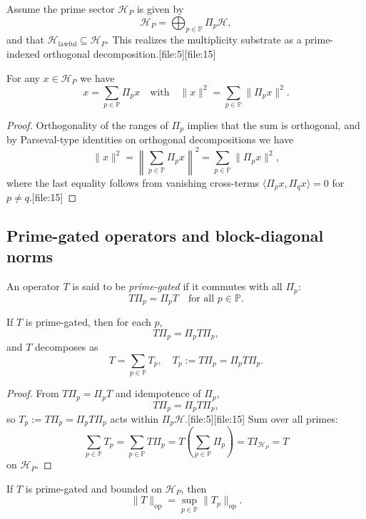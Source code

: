 \documentclass[11pt]{article}
\begin{document}
Assume the prime sector \(\mathcal{H}_P\) is given by
\[
\mathcal{H}_P = \bigoplus_{p\in\mathbb{P}} \Pi_p \mathcal{H},
\]
and that \(\mathcal{H}_{\mathrm{lawful}}\subseteq \mathcal{H}_P\).  
This realizes the multiplicity substrate as a prime-indexed orthogonal decomposition.[file:5][file:15]

\begin{lemma}
For any \(x\in\mathcal{H}_P\) we have
\[
x = \sum_{p\in\mathbb{P}} \Pi_p x \quad\text{with}\quad \|x\|^2 = \sum_{p\in\mathbb{P}} \|\Pi_p x\|^2.
\]
\end{lemma}

\begin{proof}
Orthogonality of the ranges of \(\Pi_p\) implies that the sum is orthogonal, and by Parseval-type identities on orthogonal decompositions we have
\[
\|x\|^2 = \left\|\sum_{p\in\mathbb{P}} \Pi_p x\right\|^2 = \sum_{p\in\mathbb{P}} \|\Pi_p x\|^2,
\]
where the last equality follows from vanishing cross-terms \(\langle \Pi_p x, \Pi_q x\rangle = 0\) for \(p\ne q\).[file:15]
\end{proof}

\subsection{Prime-gated operators and block-diagonal norms}

An operator \(T\) is said to be \emph{prime-gated} if it commutes with all \(\Pi_p\):
\[
T\Pi_p = \Pi_p T \quad\text{for all } p\in\mathbb{P}.
\]

\begin{lemma}
If \(T\) is prime-gated, then for each \(p\),
\[
T\Pi_p = \Pi_p T \Pi_p,
\]
and \(T\) decomposes as
\[
T = \sum_{p\in\mathbb{P}} T_p,\quad T_p := T\Pi_p = \Pi_p T \Pi_p.
\]
\end{lemma}

\begin{proof}
From \(T\Pi_p = \Pi_p T\) and idempotence of \(\Pi_p\),
\[
T\Pi_p = \Pi_p T \Pi_p,
\]
so \(T_p := T\Pi_p = \Pi_p T \Pi_p\) acts within \(\Pi_p \mathcal{H}\).[file:5][file:15]  
Sum over all primes:
\[
\sum_{p\in\mathbb{P}} T_p = \sum_{p\in\mathbb{P}} T\Pi_p = T \left( \sum_{p\in\mathbb{P}} \Pi_p \right) = TI_{\mathcal{H}_P} = T
\]
on \(\mathcal{H}_P\).
\end{proof}

\begin{proposition}
If \(T\) is prime-gated and bounded on \(\mathcal{H}_P\), then
\[
\|T\|_{\mathrm{op}} = \sup_{p\in\mathbb{P}} \|T_p\|_{\mathrm{op}}.
\]
\end{proposition}
\end{document}
